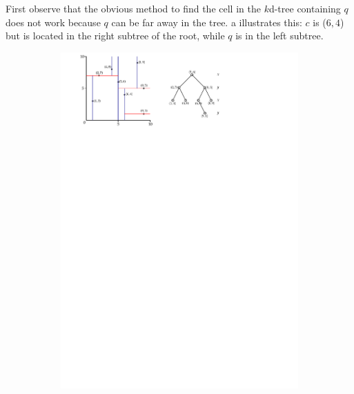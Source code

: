 First observe that the obvious method to find the cell in the $k$d-tree containing $q$ does not work because $q$ can be far away in the tree.
a illustrates this: $c$ is ($6,4$) but is located in the right subtree of the root, while $q$ is in the left subtree.
\begin{figure}
  \centering
  \begin{subfigure}[b]{0.6\linewidth}
    \centering
    \includegraphics[page=2,width=\textwidth]{figs/kdtree_nn.pdf}
    \caption{}
  \end{subfigure}
  \begin{subfigure}[b]{0.6\linewidth}
    \centering

\end{subfigure}
\end{figure}

